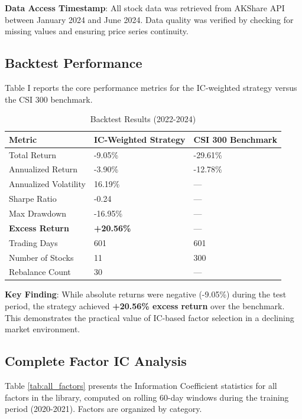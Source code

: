 \documentclass[12pt]{article}
\begin{document}
\noindent \textbf{Data Access Timestamp}: All stock data was retrieved from AKShare API between January 2024 and June 2024. Data quality was verified by checking for missing values and ensuring price series continuity.

\subsection{Backtest Performance}

Table I reports the core performance metrics for the IC-weighted strategy versus the CSI 300 benchmark.

\begin{table}[h]
\centering
\caption{Backtest Results (2022-2024)}
\begin{tabular}{lll}
\toprule
\textbf{Metric} & \textbf{IC-Weighted Strategy} & \textbf{CSI 300 Benchmark} \\
\midrule
Total Return & -9.05\% & -29.61\% \\
Annualized Return & -3.90\% & -12.78\% \\
Annualized Volatility & 16.19\% & --- \\
Sharpe Ratio & -0.24 & --- \\
Max Drawdown & -16.95\% & --- \\
\textbf{Excess Return} & \textbf{+20.56\%} & --- \\
Trading Days & 601 & 601 \\
Number of Stocks & 11 & 300 \\
Rebalance Count & 30 & --- \\
\bottomrule
\end{tabular}
\end{table}

\textbf{Key Finding}: While absolute returns were negative (-9.05\%) during the test period, the strategy achieved \textbf{+20.56\% excess return} over the benchmark. This demonstrates the practical value of IC-based factor selection in a declining market environment.

\subsection{Complete Factor IC Analysis}

Table \ref{tab:all_factors} presents the Information Coefficient statistics for all factors in the library, computed on rolling 60-day windows during the training period (2020-2021). Factors are organized by category.
\end{document}
